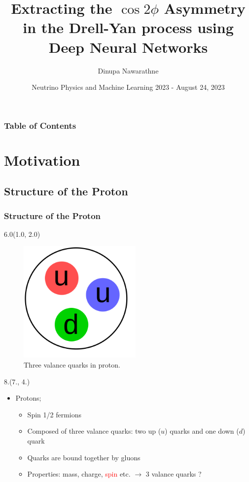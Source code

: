 \documentclass[12pt, xcolor={dvipsnames}, aspectratio = 169, sans,mathserif]{beamer}
\title{Extracting the $\cos2\phi$ Asymmetry in the Drell-Yan process using Deep Neural Networks}
\author{Dinupa Nawarathne}
\institute{New Mexico State University \\
  Representing the E906/SeaQuest Collaboration
}
\date{Neutrino Physics and Machine Learning 2023 - August 24, 2023}
\newenvironment{List}[2]
{\begin{textblock}{#1}#2
\begin{itemize}}
{\end{itemize}
\end{textblock}}
\newenvironment{Pic}[2]
{\begin{textblock}{#1}#2
\begin{figure}}
{\end{figure}
\end{textblock}}
\begin{document}
\begin{frame}
    \maketitle
\end{frame}

\begin{frame}
    \frametitle{Table of Contents}
    \tableofcontents
\end{frame}

\section{Motivation}
\subsection{Structure of the Proton}

\begin{frame}
\frametitle{Structure of the Proton}

\begin{Pic}{6.0}{(1.0, 2.0)}
    \includegraphics[width=6.0cm]{imgs/proton3.png}
    \caption{Three valance quarks in proton.}
\end{Pic}

\begin{List}{8.}{(7., 4.)}

    \item Protons;

    \begin{itemize}

        \item Spin 1/2 fermions

        \item Composed of three valance quarks: two up ($u$) quarks and one down ($d$) quark

        \item Quarks are bound together by gluons

        \item Properties: mass, charge, \textcolor{red}{spin} etc. $\rightarrow$ 3 valance quarks ?

    \end{itemize}

\end{List}

\end{frame}
\end{document}
